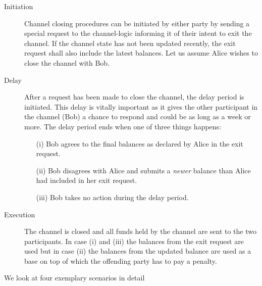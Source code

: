 \begin{description}
 \item[Initiation] Channel closing procedures can be initiated by either party by sending a special request to the channel-logic informing it of their intent to exit the channel. If the channel state has not been updated recently, the exit request shall also include the latest balances. Let us assume Alice wishes to close the channel with Bob.
 \item[Delay] After a request has been made to close the channel, the delay period is initiated. This delay is vitally important as it gives the other participant in the channel (Bob) a chance to respond and could be as long as a week or more. The delay period ends when one of three things happens:
      \begin{enumerate}
       \item[(i)] Bob agrees to the final balances as declared by Alice in the exit request.
       \item[(ii)] Bob disagrees with Alice and submits a \textit{newer} balance than Alice had included in her exit request.
       \item[(iii)] Bob takes no action during the delay period.
      \end{enumerate}
 \item[Execution] The channel is closed and all funds held by the channel are sent to the two participants. In case (i) and (iii) the balances from the exit request are used but in case (ii) the balances from the updated balance are used as a base on top of which the offending party has to pay a penalty.
\end{description}
We look at four exemplary scenarios in detail
